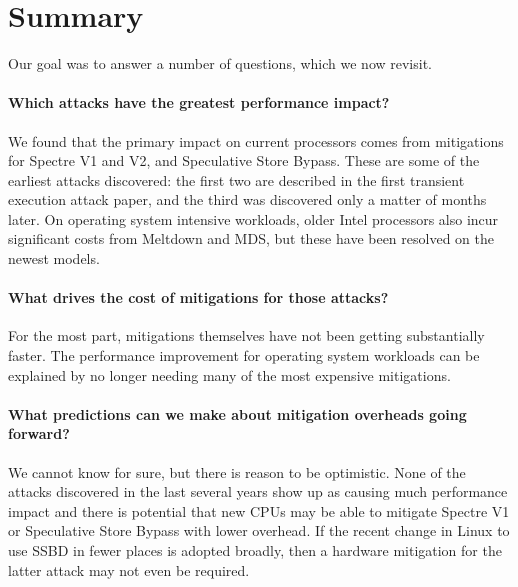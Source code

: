 \section{Summary}

Our goal was to answer a number of questions, which we now revisit.

\paragraph{Which attacks have the greatest performance impact?}

We found that the primary impact on current processors comes from mitigations for Spectre V1 and V2, and Speculative Store Bypass.
These are some of the earliest attacks discovered: the first two are described in the first transient execution attack paper, and the third was discovered only a matter of months later.
On operating system intensive workloads, older Intel processors also incur significant costs from Meltdown and MDS, but these have been resolved on the newest models.

\paragraph{What drives the cost of mitigations for those attacks?}

For the most part, mitigations themselves have not been getting substantially faster.
The performance improvement for operating system workloads can be explained by no longer needing many of the most expensive mitigations.

\paragraph{What predictions can we make about mitigation overheads going forward?}

We cannot know for sure, but there is reason to be optimistic.
None of the attacks discovered in the last several years show up as causing much performance impact and there is potential that new CPUs may be able to mitigate Spectre V1 or Speculative Store Bypass with lower overhead.
If the recent change in Linux to use SSBD in fewer places is adopted broadly, then a hardware mitigation for the latter attack may not even be required.
